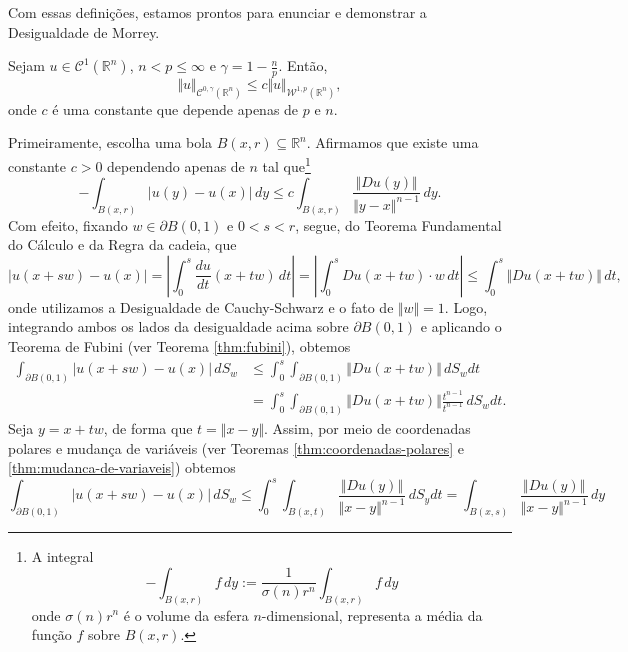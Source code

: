 \documentclass[a4paper, 11pt]{book}
\theoremstyle{definition}
\newcommand{\bR}{\mathbb{R}}
\newcommand{\cC}{\mathcal{C}}
\newcommand{\cW}{\mathcal{W}}
\newcommand{\sint}{-\!\!\!\!\!\!\int}
\begin{document}
Com essas definições, estamos prontos para enunciar e demonstrar a Desigualdade de Morrey.

\begin{tbox} \label{thm:holdersobolev1}
    Sejam $u \in \cC^1(\bR^n)$, $n < p \leqslant \infty$ e $\gamma = 1 - \frac{n}{p}$. Então,
    \[
        \Vert u \Vert_{\cC^{0,\gamma}(\bR^n)} \leqslant c \Vert u \Vert_{\cW^{1,p}(\bR^n)},
    \]
    onde $c$ é uma constante que depende apenas de $p$ e $n$.
\end{tbox}
\begin{prf}
    Primeiramente, escolha uma bola $B(x,r) \subseteq \bR^n$.
    Afirmamos que existe uma constante $c > 0$ dependendo apenas de $n$ tal que\footnote{A integral
    \[
        \sint_{B(x,r)} f\,dy := \frac{1}{\sigma(n)r^n}\int_{B(x,r)} f \,dy
    \]
    onde $\sigma(n)r^n$ é o volume da esfera $n$-dimensional, representa a média da função $f$ sobre $B(x,r)$.}
    \begin{equation} \label{eq:desigualdade-uyux}
        \sint_{B(x,r)} |u(y) - u(x)| \,dy \leqslant c \int_{B(x,r)} \frac{\Vert Du(y) \Vert}{\Vert y - x \Vert^{n-1}} \,dy.
    \end{equation}
    Com efeito, fixando $w \in \partial B(0,1)$ e $0 < s < r$, segue, do Teorema Fundamental do Cálculo e da Regra da cadeia, que
    \[
        |u(x + sw) - u(x)| = \left| \int_0^s \frac{du}{dt} (x + tw) \,dt \right| = \left|\int_0^s Du(x + tw) \cdot w \,dt \right| \leqslant \int_0^s \Vert Du(x + tw) \Vert \,dt,
    \]
    onde utilizamos a Desigualdade de Cauchy-Schwarz e o fato de $\Vert w \Vert = 1$. Logo, integrando ambos os lados da desigualdade acima sobre $\partial B(0,1)$ e aplicando o Teorema de Fubini (ver Teorema \ref{thm:fubini}), obtemos
    \[
        \begin{aligned}
            \int_{\partial B(0,1)} |u(x + sw) - u(x)|\,dS_w &\leqslant  \int_0^s \int_{\partial B(0,1)} \Vert Du(x + tw) \Vert \,dS_wdt\\ 
            &= \int_0^s \int_{\partial B(0,1)} \Vert Du(x + tw) \Vert \frac{t^{n-1}}{t^{n-1}} \,dS_wdt.
        \end{aligned}
    \]
    Seja $y = x + tw$, de forma que $t = \Vert x - y \Vert$. Assim, por meio de coordenadas polares e mudança de variáveis (ver Teoremas \ref{thm:coordenadas-polares} e \ref{thm:mudanca-de-variaveis}) obtemos
    \[
        \int_{\partial B(0,1)} |u(x + sw) - u(x)|\,dS_w \leqslant \int_0^s \int_{B(x,t)} \frac{\Vert Du(y) \Vert}{\Vert x - y \Vert^{n-1}} \,dS_ydt =  \int_{B(x,s)} \frac{\Vert Du(y) \Vert}{\Vert x - y \Vert^{n-1}} \,dy
\]
\end{prf}
\end{document}
